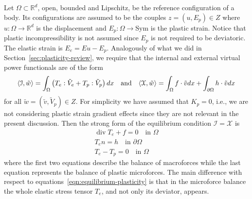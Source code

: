 \documentclass[a4paper,10pt,oneside]{amsbook}
\numberwithin{section}{chapter}
\numberwithin{equation}{chapter}
\theoremstyle{definition}
\DeclareMathOperator{\diver}{div}
\DeclarePairedDelimiter{\dual}{\langle}{\rangle}
\begin{document}
Let $\Omega\subset\mathbb{R}^d$, open, bounded and Lipschitz, be the reference configuration of a body. Its configurations are assumed to be the couples $z=(u,E_p)\in Z$ where $u\colon\Omega\to\mathbb{R}^d$ is the displacement and $E_p\colon\Omega\to\text{Sym}$ is the plastic strain. Notice that plastic incompressibility is not assumed since $E_p$ is not required to be deviatoric. The elastic strain is $E_e=Eu-E_p$. Analogously of what we did in Section~\ref{sec:plasticity-review}, we require that the internal and external virtual power functionals are of the form
\[
\dual{\mathcal{I},\tilde w}=\int_\Omega\left(T_e:\tilde V_e+T_p:\tilde V_p\right)dx
\quad\text{and}\quad
\dual{\mathcal{X},\tilde w}=\int_\Omega f\cdot\tilde vdx+\int_{\partial\Omega}h\cdot\tilde vdx
\]
for all $\tilde w=(\tilde v,\tilde V_p)\in Z$. For simplicity we have assumed that $K_p=0$, i.e., we are not considering plastic strain gradient effects since they are not relevant in the present discussion. Then the strong form of the equilibrium condition $\mathcal{I}=\mathcal{X}$ is
\begin{gather}
\diver T_e+f=0\quad\text{in $\Omega$} \\
T_en=h\quad\text{in $\partial\Omega$} \\
T_e-T_p=0\quad\text{in $\Omega$}
\end{gather}
where the first two equations describe the balance of macroforces while the last equation represents the balance of plastic microforces. The main difference with respect to equations~\eqref{eqn:equilibrium-plasticity} is that in the microforce balance the whole elastic stress tensor $T_e$, and not only its deviator, appears.
\end{document}
